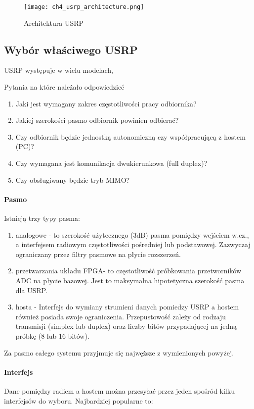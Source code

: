 \begin{figure}
\centering
\texttt{[image: ch4\_usrp\_architecture.png]}
\caption{Architektura USRP}
\label{usrp_architecture}
\end{figure}

\subsection{Wybór właściwego USRP}
USRP występuje w wielu modelach, 

Pytania na które należało odpowiedzieć
\begin{enumerate}
\item Jaki jest wymagany zakres częstotliwości pracy odbiornika?
\item Jakiej szerokości pasmo odbiornik powinien odbierać?
\item Czy odbiornik będzie jednostką autonomiczną czy współpracującą z hostem (PC)?
\item Czy wymagana jest komunikacja dwukierunkowa (full duplex)?
\item Czy obsługiwany będzie tryb MIMO?
\end{enumerate}

\paragraph{Pasmo}
Istnieją trzy typy pasma:
\begin{enumerate}
\item analogowe - to szerokość użytecznego (3dB) pasma pomiędzy wejściem w.cz., a interfejsem radiowym częstotliwości pośredniej lub podstawowej. Zazwyczaj ograniczany przez filtry pasmowe na płycie rozszerzeń.
\item przetwarzania układu FPGA- to częstotliwość próbkowania przetworników ADC na płycie bazowej. Jest to maksymalna hipotetyczna szerokość pasma dla USRP.
\item hosta - Interfejs do wymiany strumieni danych pomiedzy USRP a hostem również posiada swoje ograniczenia. Przepustowość zależy od rodzaju transmisji (simplex lub duplex) oraz liczby bitów przypadającej na jedną próbkę (8 lub 16 bitów). 
\end{enumerate}

Za pasmo całego systemu przyjmuje się najwęższe z wymienionych powyżej. \cite{usrp_bw}
 
\paragraph{Interfejs} Dane pomiędzy radiem a hostem można przesyłać przez jeden spośród kilku interfejsów do wyboru. Najbardziej popularne to:

